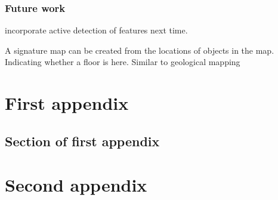 \documentclass{mproj}
\begin{document}
\subsection{Future work}

incorporate active detection of features next time.

A signature map can be created from the locations of objects in the map. Indicating whether a floor is here. Similar to geological mapping


\appendix %
\chapter{First appendix}

\section{Section of first appendix}

\chapter{Second appendix}



\end{document}
